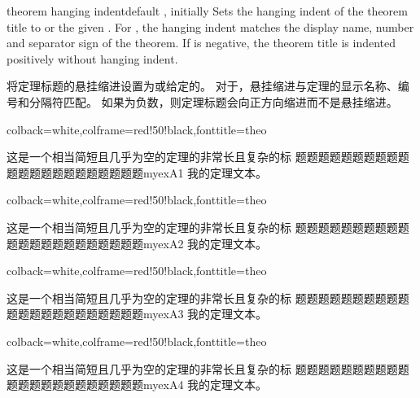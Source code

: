 \begin{docTcbKey}[][doc new=2020-10-21]{theorem hanging indent}{}{default , initially }
Sets the hanging indent of the theorem title to  or the
given .
For , the hanging indent matches the display name, number and
separator sign of the theorem.
If  is negative, the theorem title is indented positively
without hanging indent.

将定理标题的悬挂缩进设置为或给定的。 对于，悬挂缩进与定理的显示名称、编号和分隔符匹配。 如果为负数，则定理标题会向正方向缩进而不是悬挂缩进。

\begin{dispExample}
%
{colback=white,colframe=red!50!black,fonttitle=\bfseries}{theo}
\begin{sometheorem}{这是一个相当简短且几乎为空的定理的非常长且复杂的标%
题题题题题题题题题题题题题题题题题题题题题题}{myexA1}
我的定理文本。
\end{sometheorem}
\end{dispExample}
\begin{dispExample}
%
{colback=white,colframe=red!50!black,fonttitle=\bfseries}{theo}
\begin{sometheorem}[theorem hanging indent=5mm]{这是一个相当简短且几乎为空的定理的非常长且复杂的标%
    题题题题题题题题题题题题题题题题题题题题题题}{myexA2}
我的定理文本。
\end{sometheorem}
\end{dispExample}
\begin{dispExample}
%
{colback=white,colframe=red!50!black,fonttitle=\bfseries}{theo}
\begin{sometheorem}[theorem hanging indent=0pt]{这是一个相当简短且几乎为空的定理的非常长且复杂的标%
    题题题题题题题题题题题题题题题题题题题题题题}{myexA3}
我的定理文本。
\end{sometheorem}
\end{dispExample}

\begin{dispExample}
%
{colback=white,colframe=red!50!black,fonttitle=\bfseries}{theo}
\begin{sometheorem}[theorem hanging indent=-5mm]{这是一个相当简短且几乎为空的定理的非常长且复杂的标%
题题题题题题题题题题题题题题题题题题题题题题}{myexA4}
我的定理文本。
\end{sometheorem}
\end{dispExample}
\end{docTcbKey}




